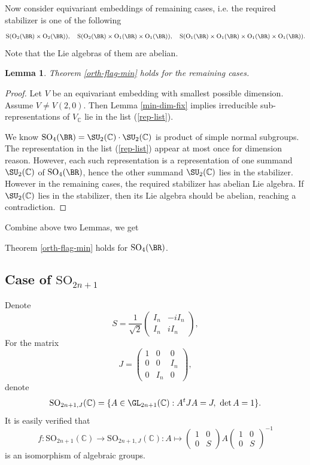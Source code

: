 \documentclass[a4paper]{amsart}
\newcommand{\BC}{{\mathbb {C}}} \newcommand{\BD}{{\mathbb {D}}}
\newcommand{\RO}{{\mathrm {O}}} \newcommand{\RP}{{\mathrm {P}}}
\newcommand{\RS}{{\mathrm {S}}} \newcommand{\RT}{{\mathrm {T}}}
\newcommand{\SO}{{\mathrm{SO}}}\newcommand{\so}{\mathfrak{so}}
\theoremstyle{plain}
\newtheorem{lem}[thm]{Lemma}
\theoremstyle{remark} \newtheorem{remark}[thm]{Remark}
\theoremstyle{remark} \newtheorem{exercise}{Exercise}
\theoremstyle{remark} \newtheorem{example}{Example}
\numberwithin{equation}{section}
\begin{document}
Now consider equivariant embeddings of remaining cases, i.e. the required stabilizer is one of the following
\[\RS(\RO_2(\BR)\times\RO_2(\BR)),\quad\RS(\RO_2(\BR)\times\RO_1(\BR)\times\RO_1(\BR)),\quad \RS(\RO_1(\BR)\times\RO_1(\BR)\times\RO_1(\BR)\times\RO_1(\BR)).\]
Note that the Lie algebras of them are abelian.

\begin{lem}
    Theorem \ref{orth-flag-min} holds for the remaining cases. 
\end{lem}
\begin{proof}
    Let $V$ be an equivariant embedding with smallest possible dimension. Assume $V\neq V(2,0)$. Then Lemma \ref{min-dim-fix} implies irreducible sub-representations of $V_\BC$ lie in the list (\ref{rep-list}).

    We know $\SO_4(\BR)=\SU_2(\BC)\cdot\SU_2(\BC)$ is product of simple normal subgroups. The representation in the list (\ref{rep-list}) appear at most once for dimension reason. However, each such representation is a representation of one summand $\SU_2(\BC)$ of $\SO_4(\BR)$, hence the other summand $\SU_2(\BC)$ lies in the stabilizer. However in the remaining cases, the required stabilizer has abelian Lie algebra. If $\SU_2(\BC)$ lies in the stabilizer, then its Lie algebra should be abelian, reaching a contradiction.
\end{proof}

Combine above two Lemmas, we get

\begin{cor}\label{SO4-thm}
    Theorem \ref{orth-flag-min} holds for $\SO_4(\BR)$.
\end{cor}

\subsection{Case of $\SO_{2n+1}$}

Denote
\[S=\frac{1}{\sqrt 2}\begin{pmatrix}I_n&-iI_n\\I_n&iI_n\end{pmatrix},\]
For the matrix 
\[J=\begin{pmatrix} 1&0&0\\0&0&I_n\\0&I_n&0\end{pmatrix},\]
denote
\[\SO_{2n+1,J}(\BC)=\{A\in\GL_{2n+1}(\BC):A^tJA=J,\ \det A=1\}.\]
It is easily verified that
\begin{equation}
    f:\SO_{2n+1}(\BC)\to\SO_{2n+1,J}(\BC):A\mapsto\begin{pmatrix}1&0\\0&S\end{pmatrix}A\begin{pmatrix}1&0\\0&S\end{pmatrix}^{-1}
\end{equation}
is an isomorphism of algebraic groups.
\end{document}
